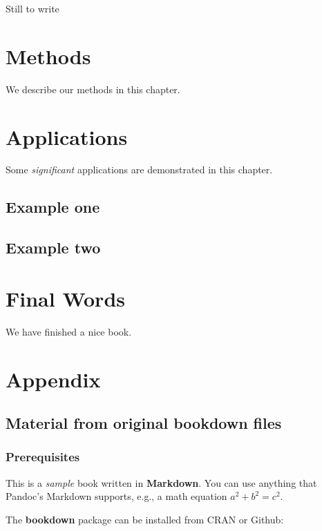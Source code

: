 \documentclass[]{book}
\theoremstyle{definition}
\theoremstyle{definition}
\theoremstyle{definition}
\theoremstyle{remark}
\begin{document}
Still to write

\chapter{Methods}\label{methods}

We describe our methods in this chapter.

\chapter{Applications}\label{applications}

Some \emph{significant} applications are demonstrated in this chapter.

\section{Example one}\label{example-one}

\section{Example two}\label{example-two}

\chapter{Final Words}\label{final-words}

We have finished a nice book.

\chapter{Appendix}\label{appendix}

\section{Material from original bookdown
files}\label{material-from-original-bookdown-files}

\subsection{Prerequisites}\label{prerequisites}

This is a \emph{sample} book written in \textbf{Markdown}. You can use
anything that Pandoc's Markdown supports, e.g., a math equation
\(a^2 + b^2 = c^2\).

The \textbf{bookdown} package can be installed from CRAN or Github:
\end{document}
